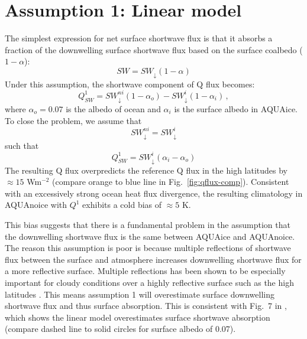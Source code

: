 \documentclass{article}
\begin{document}
\section{Assumption 1: Linear model}
The simplest expression for net surface shortwave flux is that it absorbs a fraction of the downwelling surface shortwave flux based on the surface coalbedo ($1-\alpha$):
\begin{equation}
    SW=SW_{\downarrow}(1-\alpha)
\end{equation}
Under this assumption, the shortwave component of Q flux becomes:
\begin{equation}
    Q^1_{SW}=SW^{ni}_{\downarrow}(1-\alpha_o)-SW^{i}_{\downarrow}(1-\alpha_i)\,,
\end{equation}
where $\alpha_o=0.07$ is the albedo of ocean and $\alpha_i$ is the surface albedo in AQUAice. To close the problem, we assume that
\begin{equation}
    SW^{ni}_\downarrow=SW^{i}_\downarrow
\end{equation}
such that
\begin{equation} \label{eq:qs1}
    Q^1_{SW}=SW^{i}_{\downarrow}(\alpha_i-\alpha_o)
\end{equation}
The resulting Q flux overpredicts the reference Q flux in the high latitudes by $\approx15$ Wm$^{-2}$ (compare orange to blue line in Fig.~\ref{fig:qflux-comp}). Consistent with an excessively strong ocean heat flux divergence, the resulting climatology in AQUAnoice with $Q^1$ exhibits a cold bias of $\approx 5$ K.

This bias suggests that there is a fundamental problem in the assumption that the downwelling shortwave flux is the same between AQUAice and AQUAnoice. The reason this assumption is poor is because multiple reflections of shortwave flux between the surface and atmosphere increases downwelling shortwave flux for a more reflective surface. Multiple reflections has been shown to be especially important for cloudy conditions over a highly reflective surface such as the high latitudes \citep{schneider1976,wendler1981,shine1984,rouse1987,wendler2004,wyser2008}. This means assumption 1 will overestimate surface downwelling shortwave flux and thus surface absorption. This is consistent with Fig.~7 in \cite{winton2005}, which shows the linear model overestimates surface shortwave absorption (compare dashed line to solid circles for surface albedo of 0.07).
\end{document}
